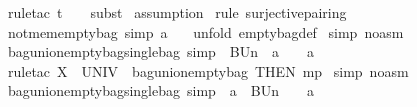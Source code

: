 \begin{isabellebody}
\isamarkupfalse%
\ {\isacharparenleft}rule{\isacharunderscore}tac\ t\ {\isacharequal}\ {\isachardoublequoteopen}{}{\isachardoublequoteclose}\ \ subst{\isacharparenright}\isanewline
{}\isamarkupfalse%
\ assumption\isanewline
{}\isamarkupfalse%
\ {\isacharparenleft}rule\ surjective{\isacharunderscore}pairing{\isacharparenright}\isanewline
{}\isamarkupfalse%
%
\endisatagproof
{\isafoldproof}%
%
\isadelimproof
\isanewline
%
\endisadelimproof
\isanewline
{}\isamarkupfalse%
\ not{\isacharunderscore}mem{\isacharunderscore}emptybag\ {\isacharbrackleft}simp{\isacharbrackright}{\isacharcolon}\ {\isachardoublequoteopen}a\ {\isachartilde}{\isacharcolon}\ {\isacharpercent}{\isacharbrackleft}{\isacharpercent}{\isacharbrackright}{\isachardoublequoteclose}\isanewline
%
\isadelimproof
%
\endisadelimproof
%
\isatagproof
{}\isamarkupfalse%
\ {\isacharparenleft}unfold\ emptybag{\isacharunderscore}def{\isacharparenright}\isanewline
{}\isamarkupfalse%
\ {\isacharparenleft}simp\ {\isacharparenleft}no{\isacharunderscore}asm{\isacharparenright}{\isacharparenright}\isanewline
{}\isamarkupfalse%
%
\endisatagproof
{\isafoldproof}%
%
\isadelimproof
%
\endisadelimproof
%
\isamarkuptrue%
\isamarkupfalse%
\ bagunion{\isacharunderscore}emptybag{\isacharunderscore}singlebag\ {\isacharbrackleft}simp{\isacharbrackright}{\isacharcolon}\ {\isachardoublequoteopen}{\isacharparenleft}{\isacharpercent}{\isacharbrackleft}{\isacharpercent}{\isacharbrackright}\ BUn\ {\isacharpercent}{\isacharbrackleft}\ a\ {\isacharpercent}{\isacharbrackright}{\isacharparenright}\ {\isacharequal}\ {\isacharpercent}{\isacharbrackleft}\ a\ {\isacharpercent}{\isacharbrackright}{\isachardoublequoteclose}\isanewline
%
\isadelimproof
%
\endisadelimproof
%
\isatagproof
{}\isamarkupfalse%
\ {\isacharparenleft}rule{\isacharunderscore}tac\ X{}\ {\isacharequal}\ {\isachardoublequoteopen}UNIV{\isachardoublequoteclose}\ \ bagunion{\isacharunderscore}emptybag\ {\isacharbrackleft}THEN\ mp{\isacharbrackright}{\isacharparenright}\isanewline
{}\isamarkupfalse%
\ {\isacharparenleft}simp\ {\isacharparenleft}no{\isacharunderscore}asm{\isacharparenright}{\isacharparenright}\isanewline
{}\isamarkupfalse%
%
\endisatagproof
{\isafoldproof}%
%
\isadelimproof
\isanewline
%
\endisadelimproof
\isanewline
{}\isamarkupfalse%
\ bagunion{\isacharunderscore}emptybag{\isacharunderscore}singlebag{}\ {\isacharbrackleft}simp{\isacharbrackright}{\isacharcolon}\ {\isachardoublequoteopen}{\isacharparenleft}{\isacharpercent}{\isacharbrackleft}\ a\ {\isacharpercent}{\isacharbrackright}\ BUn\ {\isacharpercent}{\isacharbrackleft}{\isacharpercent}{\isacharbrackright}{\isacharparenright}\ {\isacharequal}\ {\isacharpercent}{\isacharbrackleft}\ a\ {\isacharpercent}{\isacharbrackright}{\isachardoublequoteclose}\isanewline

\end{isabellebody}
